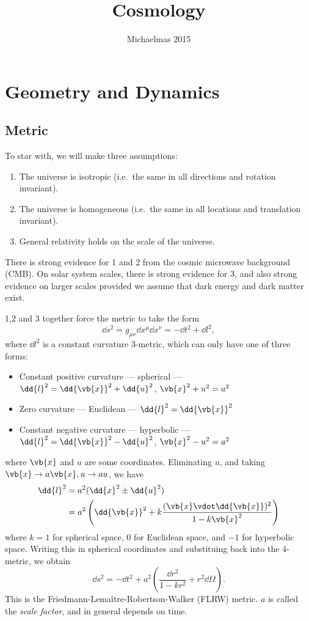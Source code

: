 \documentclass{jknotes}
\title{Cosmology}
\date{Michaelmas 2015}
\begin{document}
\maketitle
\suggestionsspiel

\tableofcontents

\section{Geometry and Dynamics}
\subsection{Metric}
To star with, we will make three assumptions:
\begin{enumerate}
    \item The universe is isotropic (i.e.\ the same in all directions and rotation invariant).
    \item The universe is homogeneous (i.e.\ the same in all locations and translation invariant).
    \item General relativity holds on the scale of the universe.
\end{enumerate}

There is strong evidence for 1 and 2 from the cosmic microwave background (CMB). On solar system scales, there is strong evidence for 3, and also strong evidence on larger scales provided we assume that dark energy and dark matter exist.

1,2 and 3 together force the metric to take the form
\begin{equation}
    \dd{s}^2 = g_{\mu\nu}\dd{x^\mu}\dd{x^\nu} = -\dd{t}^2+\dd{l}^2,
\end{equation}
where \(\dd{l}^2\) is a constant curvature 3-metric, which can only have one of three forms:
\begin{itemize}
    \item Constant positive curvature --- spherical --- \(\dd{l}^2 = \dd{\vb{x}}^2 + \dd{u}^2\), \(\vb{x}^2+u^2=a^2\)
    \item Zero curvature --- Euclidean --- \(\dd{l}^2=\dd{\vb{x}}^2\)
    \item Constant negative curvature --- hyperbolic --- \(\dd{l}^2 = \dd{\vb{x}}^2 - \dd{u}^2\), \(\vb{x}^2-u^2=a^2\)
\end{itemize}
where \(\vb{x}\) and \(u\) are some coordinates. Eliminating \(u\), and taking \(\vb{x}\to a\vb{x}, u\to au\), we have
\begin{align}
    \dd{l}^2 &= a^2(\dd{x}^2\pm\dd{u}^2) \\
             &= a^2\left(\dd{\vb{x}}^2 + k\frac{(\vb{x}\vdot\dd{\vb{x}})^2}{1-k\vb{x}^2}\right) 
\end{align}
where \(k= 1\) for spherical space, \(0\) for Euclidean space, and \(-1\) for hyperbolic space. Writing this in spherical coordinates and substituing back into the 4-metric, we obtain
\begin{equation}
    \dd{s}^2 = -\dd{t}^2 + a^2\left(\frac{\dd{r}^2}{1-kr^2}+r^2\dd{\Omega}\right).
\end{equation}
This is the Friedmann-Lema\^itre-Robertson-Walker (FLRW) metric. \(a\) is called the \emph{scale factor}, and in general depends on time.
\end{document}
